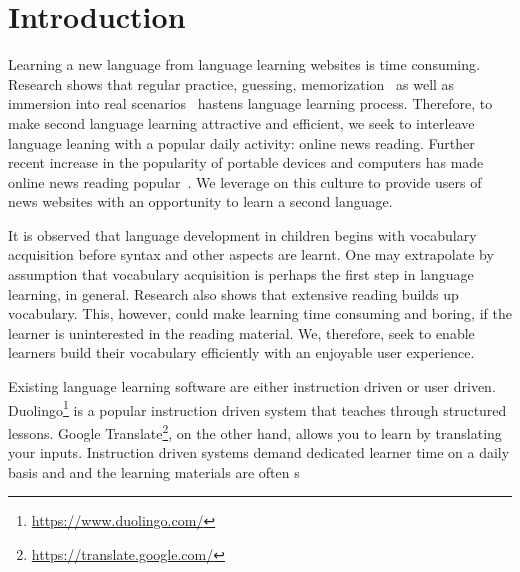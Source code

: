 \section{Introduction}
Learning a new language from language learning websites is 
time consuming. Research shows that regular practice, guessing, 
memorization~\cite{rubin91} as well as immersion into real scenarios~\cite{naiman78} hastens language learning process. 
Therefore, to make second language learning 
attractive and efficient, we seek to interleave language leaning 
with a popular daily activity: online news reading.
Further recent increase in the popularity of 
portable devices and computers has made online news reading popular~\cite{yarlh2012}. 
We leverage on this culture to provide users of news websites with an opportunity to learn a second language.

It is observed that language development in children begins with 
vocabulary acquisition before syntax and other aspects are learnt. One may 
extrapolate by assumption that vocabulary acquisition is perhaps the first step in language learning, in general. Research also shows that extensive reading builds up vocabulary. This, however, could make learning time consuming and boring, if the learner is uninterested in the reading material. We, therefore, seek to enable learners build 
their vocabulary efficiently with an enjoyable user experience.

Existing language learning software are either instruction driven or user driven. 
Duolingo\footnote{\url{https://www.duolingo.com/}} is a popular instruction driven system that teaches through structured lessons. Google Translate\footnote{\url{https://translate.google.com/}}, on the other hand, allows you to learn by translating your inputs. Instruction driven systems demand dedicated learner time on a daily basis and
and the learning materials are often s

